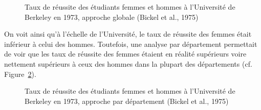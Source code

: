 \documentclass[
  letterpaper,
]{book}
\begin{document}
\begin{figure}[H]


\caption{\label{fig-taballUCBA}Taux de réussite des étudiants femmes et
hommes à l'Université de Berkeley en 1973, approche globale (Bickel et
al., 1975)}

\end{figure}%

On voit ainsi qu'à l'échelle de l'Université, le taux de réussite des
femmes était inférieur à celui des hommes. Toutefois, une analyse par
département permettait de voir que les taux de réussite des femmes
étaient en réalité supérieurs voire nettement supérieurs à ceux des
hommes dans la plupart des départements (cf.
Figure~\ref{fig-tabdepUCBA}).

\begin{figure}


\caption{\label{fig-tabdepUCBA}Taux de réussite des étudiants femmes et
hommes à l'Université de Berkeley en 1973, approche par département
(Bickel et al., 1975)}

\end{figure}%
\end{document}
